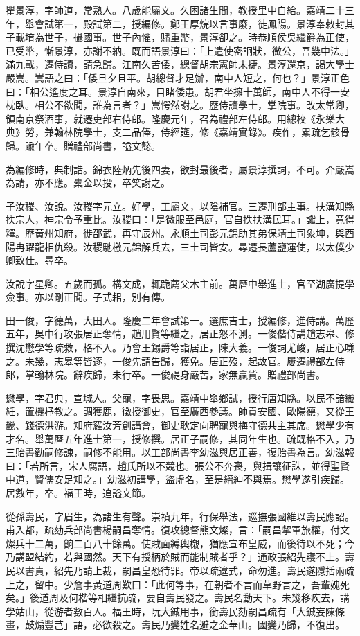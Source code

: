 \begin{pinyinscope}
{瞿景淳，字師道，常熟人。八歲能屬文。久困諸生間，教授里中自給。嘉靖二十三年，舉會試第一，殿試第二，授編修。鄭王厚烷以言事廢，徙鳳陽。景淳奉敕封其子載堉為世子，攝國事。世子內懼，贐重幣，景淳卻之。時恭順侯吳繼爵為正使，已受幣，慚景淳，亦謝不納。既而語景淳曰：「上遣使密詗狀，微公，吾幾中法。」滿九載，遷侍讀，請急歸。江南久苦倭，總督胡宗憲師未捷。景淳還京，謁大學士嚴嵩。嵩語之曰：「倭旦夕且平。胡總督才足辦，南中人短之，何也？」景淳正色曰：「相公遙度之耳。景淳自南來，目睹倭患。胡君坐擁十萬師，南中人不得一安枕臥。相公不欲聞，誰為言者？」嵩愕然謝之。歷侍讀學士，掌院事。改太常卿，領南京祭酒事，就遷吏部右侍郎。隆慶元年，召為禮部左侍郎。用總校《永樂大典》勞，兼翰林院學士，支二品俸，侍經筵，修《嘉靖實錄》。疾作，累疏乞骸骨歸。踰年卒。贈禮部尚書，謚文懿。

為編修時，典制誥。錦衣陸炳先後四妻，欲封最後者，屬景淳撰詞，不可。介嚴嵩為請，亦不應。橐金以投，卒笑謝之。

子汝稷、汝說。汝稷字元立。好學，工屬文，以陰補官。三遷刑部主事。扶溝知縣抶宗人，神宗令予重比。汝稷曰：「是微服至邑庭，官自抶扶溝民耳。」讞上，竟得釋。歷黃州知府，徙邵武，再守辰州。永順土司彭元錦助其弟保靖土司象坤，與酉陽冉躍龍相仇殺。汝稷馳檄元錦解兵去，三土司皆安。尋遷長蘆鹽運使，以太僕少卿致仕。尋卒。

汝說字星卿。五歲而孤。構文成，輒跪薦父木主前。萬曆中舉進士，官至湖廣提學僉事。亦以剛正聞。子式耜，別有傳。

田一俊，字德萬，大田人。隆慶二年會試第一。選庶吉士，授編修，進侍講。萬歷五年，吳中行攻張居正奪情，趙用賢等繼之，居正怒不測。一俊偕侍講趙志皋、修撰沈懋學等疏救，格不入。乃會王錫爵等詣居正，陳大義。一俊詞尤峻，居正心嗛之。未幾，志皋等皆逐，一俊先請告歸，獲免。居正歿，起故官。屢遷禮部左侍郎，掌翰林院。辭疾歸，未行卒。一俊禔身嚴苦，家無贏貲。贈禮部尚書。

懋學，字君典，宣城人。父寵，字畏思。嘉靖中舉鄉試，授行唐知縣。以民不諳織紝，置機杼教之。調獲鹿，徵授御史，官至廣西參議。師貢安國、歐陽德，又從王畿、錢德洪游。知府羅汝芳創講會，御史耿定向聘寵與梅守德共主其席。懋學少有才名。舉萬曆五年進士第一，授修撰。居正子嗣修，其同年生也。疏既格不入，乃三貽書勸嗣修諫，嗣修不能用。以工部尚書李幼滋與居正善，復貽書為言。幼滋報曰：「若所言，宋人腐語，趙氏所以不競也。張公不奔喪，與揖讓征誅，並得聖賢中道，賢儒安足知之。」幼滋初講學，盜虛名，至是縉紳不與焉。懋學遂引疾歸。居數年，卒。福王時，追謚文節。

從孫壽民，字眉生，為諸生有聲。崇禎九年，行保舉法，巡撫張國維以壽民應詔。甫入都，疏劾兵部尚書楊嗣昌奪情。復攻總督熊文燦，言：「嗣昌挈軍旅權，付文燦兵十二萬，餉二百八十餘萬。使賊面縛輿櫬，猶應宣布皇威，而後待以不死；今乃講盟結約，若與國然。天下有授柄於賊而能制賊者乎？」通政張紹先寢不上。壽民以書責，紹先乃請上裁，嗣昌皇恐待罪。帝以疏違式，命勿進。壽民遂隱括兩疏上之，留中。少詹事黃道周歎曰：「此何等事，在朝者不言而草野言之，吾輩媿死矣。」後道周及何楷等相繼抗疏，要自壽民發之。壽民名動天下。未幾移疾去，講學姑山，從游者數百人。福王時，阮大鋮用事，銜壽民劾嗣昌疏有「大鋮妄陳條畫，鼓煽豐芑」語，必欲殺之。壽民乃變姓名避之金華山。國變乃歸，不復出。

}
\end{pinyinscope}
